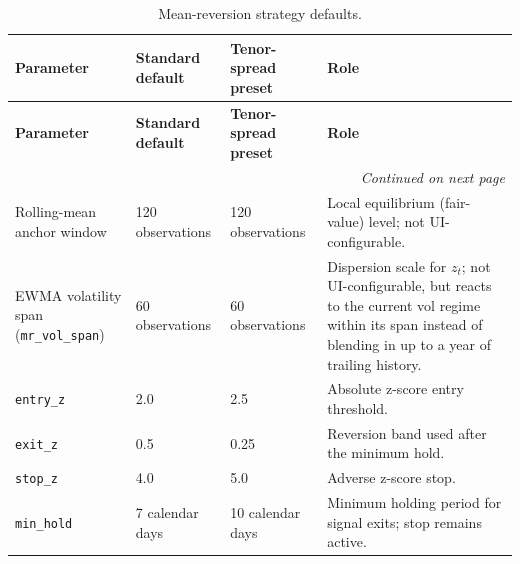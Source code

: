 {\small
\setlength{\LTleft}{0pt}
\setlength{\LTright}{0pt}
\setlength{\tabcolsep}{5pt}
\renewcommand{\arraystretch}{1.15}
\begin{longtable}{p{} p{} p{} p{}}
\caption{Mean-reversion strategy defaults.}\label{tab:pairs-mr-defaults-overleaf} \\
\toprule
\textbf{Parameter} & \textbf{Standard default} & \textbf{Tenor-spread preset} & \textbf{Role} \\
\midrule
\endfirsthead
\toprule
\textbf{Parameter} & \textbf{Standard default} & \textbf{Tenor-spread preset} & \textbf{Role} \\
\midrule
\endhead
\midrule
\multicolumn{4}{r}{\textit{Continued on next page}} \\
\midrule
\endfoot
\bottomrule
\endlastfoot
Rolling-mean anchor window & 120 observations & 120 observations & Local equilibrium (fair-value) level; not UI-configurable. \\
EWMA volatility span (\texttt{mr\_vol\_span}) & 60 observations & 60 observations & Dispersion scale for $z_t$; not UI-configurable, but reacts to the current vol regime within its span instead of blending in up to a year of trailing history. \\
\texttt{entry\_z} & 2.0 & 2.5 & Absolute z-score entry threshold. \\
\texttt{exit\_z} & 0.5 & 0.25 & Reversion band used after the minimum hold. \\
\texttt{stop\_z} & 4.0 & 5.0 & Adverse z-score stop. \\
\texttt{min\_hold} & 7 calendar days & 10 calendar days & Minimum holding period for signal exits; stop remains active. \\
\end{longtable}
}

